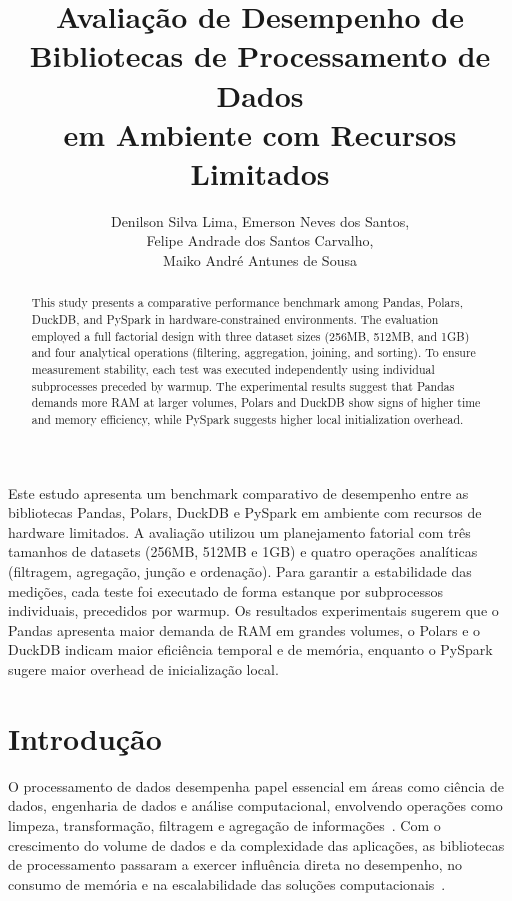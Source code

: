\documentclass[12pt]{article}
\title{Avaliação de Desempenho de Bibliotecas de Processamento de Dados\\ em Ambiente com Recursos Limitados}
\author{Denilson Silva Lima\inst{1}, Emerson Neves dos Santos\inst{1}, \\
  Felipe Andrade dos Santos Carvalho\inst{1}, \\
  Maiko André Antunes de Sousa\inst{1}}
\begin{document}
 

\maketitle

\begin{resumo} 
  Este estudo apresenta um benchmark comparativo de desempenho entre as bibliotecas Pandas, Polars, DuckDB e PySpark em ambiente com recursos de hardware limitados. A avaliação utilizou um planejamento fatorial com três tamanhos de datasets (256MB, 512MB e 1GB) e quatro operações analíticas (filtragem, agregação, junção e ordenação). Para garantir a estabilidade das medições, cada teste foi executado de forma estanque por subprocessos individuais, precedidos por warmup. Os resultados experimentais sugerem que o Pandas apresenta maior demanda de RAM em grandes volumes, o Polars e o DuckDB indicam maior eficiência temporal e de memória, enquanto o PySpark sugere maior overhead de inicialização local.
\end{resumo} 

\begin{abstract}
  This study presents a comparative performance benchmark among Pandas, Polars, DuckDB, and PySpark in hardware-constrained environments. The evaluation employed a full factorial design with three dataset sizes (256MB, 512MB, and 1GB) and four analytical operations (filtering, aggregation, joining, and sorting). To ensure measurement stability, each test was executed independently using individual subprocesses preceded by warmup. The experimental results suggest that Pandas demands more RAM at larger volumes, Polars and DuckDB show signs of higher time and memory efficiency, while PySpark suggests higher local initialization overhead.
\end{abstract}
     
\newpage

\section{Introdução}

O processamento de dados desempenha papel essencial em áreas como ciência de dados, engenharia de
dados e análise computacional, envolvendo operações como limpeza, transformação, filtragem e
agregação de informações~\cite{moutinho:2024}. Com o crescimento do volume de dados e da
complexidade das aplicações, as bibliotecas de processamento passaram a exercer influência direta no
desempenho, no consumo de memória e na escalabilidade das soluções
computacionais~\cite{cirillo:2025}.
\end{document}
